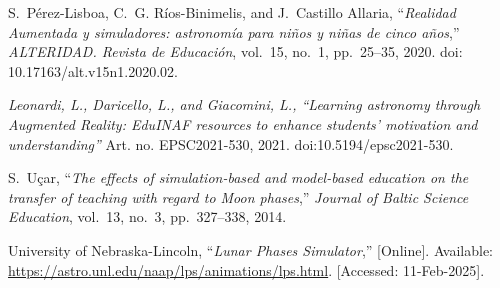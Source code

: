 \begin{thebibliography}{99}
S.~Pérez-Lisboa, C.~G. Ríos-Binimelis, and J.~Castillo Allaria, ``\textit{Realidad Aumentada y simuladores: astronomía para niños y niñas de cinco años},'' \textit{ALTERIDAD. Revista de Educación}, vol.~15, no.~1, pp.~25--35, 2020. doi: 10.17163/alt.v15n1.2020.02.


 \textit{Leonardi, L., Daricello, L., and Giacomini, L., “Learning astronomy through Augmented Reality: EduINAF resources to enhance students' motivation and understanding”}  Art. no. EPSC2021-530, 2021. doi:10.5194/epsc2021-530.

S.~Uçar, ``\textit{The effects of simulation-based and model-based education on the transfer of teaching with regard to Moon phases},'' \textit{Journal of Baltic Science Education}, vol.~13, no.~3, pp.~327--338, 2014.

University of Nebraska-Lincoln, 
``\textit{Lunar Phases Simulator},'' 
[Online]. Available: \href{https://astro.unl.edu/naap/lps/animations/lps.html}{https://astro.unl.edu/naap/lps/animations/lps.html}. 
[Accessed: 11-Feb-2025].


\end{thebibliography}
